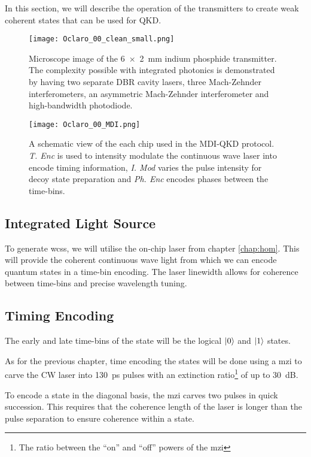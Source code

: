 In this section, we will describe the operation of the transmitters to create weak coherent states that can be used for \acl{QKD}.

\begin{figure}[tbp]
	\centering
	\texttt{[image: Oclaro\_00\_clean\_small.png]}
	\caption[InP transmitter microscope image]{Microscope image of the \SI[product-units=power]{6x2}{mm} indium phosphide transmitter. The complexity possible with integrated photonics is demonstrated by having two separate DBR cavity lasers, three Mach-Zehnder interferometers, an asymmetric  Mach-Zehnder interferometer and high-bandwidth photodiode.}
	\label{fig:oclaro_00}
\end{figure}

\begin{figure}[tbp]
	\texttt{[image: Oclaro\_00\_MDI.png]}
	\caption[InP transmitter schematic]{A schematic view of the each chip used in the MDI-QKD protocol. \textit{T. Enc} is used to intensity modulate the continuous wave laser into encode timing information, \textit{I. Mod} varies the pulse intensity for decoy state preparation and \textit{Ph. Enc} encodes phases between the time-bins.}
	\label{fig:chip_mdi_schematic}
\end{figure}

\subsection{Integrated Light Source}

To generate \acp{wcs}, we will utilise the on-chip laser from chapter \ref{chap:hom}. This will provide the coherent continuous wave light from which we can encode quantum states in a time-bin encoding. The laser linewidth allows for coherence between time-bins and precise wavelength tuning.  

\subsection{Timing Encoding}

The early and late time-bins of the state will be the logical $\ket{0}$ and $\ket{1}$ states. 

As for the previous chapter, time encoding the states will be done using a \acl{mzi} to carve the \ac{CW} laser into \SI{130}{ps} pulses with an extinction ratio\footnote{The ratio between the ``on'' and ``off'' powers of the \ac{mzi}} of up to \SI{30}{dB}.

To encode a state in the diagonal basis, the \ac{mzi} carves two pulses in quick succession. This requires that the coherence length of the laser is longer than the pulse separation to ensure coherence within a state. 

